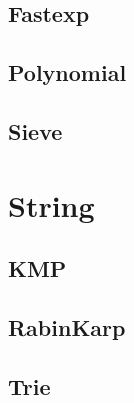 \subsection{Fastexp}
\raggedbottom
\hrulefill
\subsection{Polynomial}
\raggedbottom
\hrulefill
\subsection{Sieve}
\raggedbottom
\hrulefill

\section{String}
\subsection{KMP}
\raggedbottom
\hrulefill
\subsection{RabinKarp}
\raggedbottom
\hrulefill
\subsection{Trie}
\raggedbottom
\hrulefill

